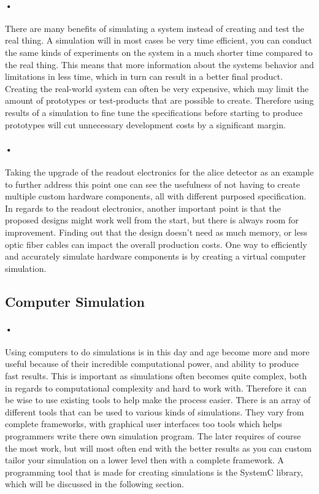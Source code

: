 \documentclass[a4paper]{report}
\begin{document}
\paragraph{•}
There are many benefits of simulating a system instead of creating and test the real thing.
A simulation will in most cases be very time efficient, you can conduct the same kinds of experiments on the system in a much shorter time compared to the real thing.
This means that more information about the systems behavior and limitations in less time, which in turn can result in a better final product.
Creating the real-world system can often be very expensive, which may limit the amount of prototypes or test-products that are possible to create.
Therefore using results of a simulation to fine tune the specifications before starting to produce prototypes will cut unnecessary development costs by a significant margin.

\paragraph{•}
Taking the upgrade of the readout electronics for the \gls{alice} detector as an example to further address this point one can see the usefulness of not having to create multiple custom hardware components, all with different purposed specification.
In regards to the readout electronics, another important point is that the proposed designs might work well from the start, but there is always room for improvement.
Finding out that the design doesn't need as much memory, or less optic fiber cables can impact the overall production costs.
One way to efficiently and accurately simulate hardware components is by creating a virtual computer simulation.

\subsection{Computer Simulation}
\paragraph{•}
Using computers to do simulations is in this day and age become more and more useful because of their incredible computational power, and ability to produce fast results.
This is important as simulations often becomes quite complex, both in regards to computational complexity and hard to work with.
Therefore it can be wise to use existing tools to help make the process easier.
There is an array of different tools that can be used to various kinds of simulations.
They vary from complete frameworks, with graphical user interfaces too tools which helps programmers write there own simulation program.
The later requires of course the most work, but will most often end with the better results as you can custom tailor your simulation on a lower level then with a complete framework.
A programming tool that is made for creating simulations is the SystemC library, which will be discussed in the following section.
\end{document}
